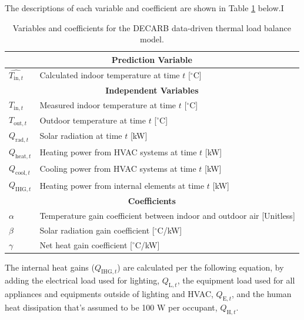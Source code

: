 \documentclass[11pt]{article}
\begin{document}
\begin{enumerate}
    The descriptions of each variable and coefficient are shown in Table \ref{tab:thermal_regression_vars} below.I
    
    \begin{table}[t!]
        \centering
        \renewcommand{\arraystretch}{1.3}
        \begin{tabular}{| l | p{9.5cm} |}
        \hline
        \multicolumn{2}{|c|}{\textbf{Prediction Variable}} \\
        \hline
        $\hat{T_{\mathrm{in},t}}$ & Calculated indoor temperature at time $t$ [$^\circ$C] \\
        \hline
        \multicolumn{2}{|c|}{\textbf{Independent Variables}} \\
        \hline
        $T_{\mathrm{in},t}$ & Measured indoor temperature at time $t$ [$^\circ$C] \\
        $T_{\mathrm{out},t}$ & Outdoor temperature at time $t$ [$^\circ$C] \\
        $Q_{\mathrm{rad},t}$ & Solar radiation at time $t$ [kW] \\
        $Q_{\mathrm{heat},t}$ & Heating power from HVAC systems at time $t$ [kW] \\
        $Q_{\mathrm{cool},t}$ & Cooling power from HVAC systems at time $t$ [kW] \\
        $Q_{\mathrm{IHG},t}$ & Heating power from internal elements at time $t$ [kW] \\
        \hline
        \multicolumn{2}{|c|}{\textbf{Coefficients}} \\
        \hline
        $\alpha$ & Temperature gain coefficient between indoor and outdoor air [Unitless] \\
        $\beta$ & Solar radiation gain coefficient [$^\circ$C/kW] \\
        $\gamma$ & Net heat gain coefficient [$^\circ$C/kW] \\
        \hline
        \end{tabular}
        \caption{Variables and coefficients for the DECARB data-driven thermal load balance model.}
        \label{tab:thermal_regression_vars}
    \end{table}

    The internal heat gains ($Q_{\mathrm{IHG},t}$) are calculated per the following equation, by adding the electrical load used for lighting, $Q_{\text{L},t}$, the equipment load used for all appliances and equipments outside of lighting and HVAC, $Q_{\text{E},t}$, and the human heat dissipation that's assumed to be 100 W per occupant, $Q_{\text{H},t}$. 


\end{enumerate}
\end{document}
